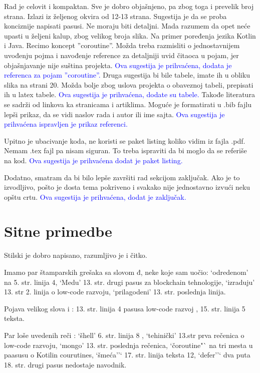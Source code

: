 \documentclass[a4paper]{report}
\newcommand{\odgovor}[1]{\textcolor{blue}{#1}}
\begin{document}
Rad je celovit i kompaktan. Sve je dobro objašnjeno, pa zbog toga i prevelik broj strana. Izlazi iz željenog okvira od 12-13 strana.
Sugestija je da se proba konciznije napisati pasusi. Ne moraju biti detaljni. Mada razumem da opet neće upasti u željeni kalup, zbog velikog broja slika. 
Na primer poređenja jezika Kotlin i Java. Recimo koncept ''coroutine''. Možda treba razmisliti o jednostavnijem uvođenju pojma i navođenje reference za detaljniji uvid čitaoca u pojam, jer objašnjavanje nije suština projekta.
\odgovor{Ova sugestija je prihvaćena, dodata je referenca za pojam ''coroutine''.}
Druga sugestija bi bile tabele, imate ih u obliku slika na strani 20. Možda bolje zbog uslova projekta o obaveznoj tabeli, prepisati ih u latex tabele.
\odgovor{Ova sugestija je prihvaćena, dodate su tabele.}
Takođe literatura se sadrži od linkova ka stranicama i artiklima. Moguće je formatirati u .bib fajlu lepši prikaz, da se vidi naslov rada i autor ili ime sajta.
\odgovor{Ova sugestija je prihvaćena ispravljen je prikaz referenci.}

Upitno je ubacivanje koda, ne koristi se paket listing koliko vidim iz fajla .pdf. Nemam .tex fajl pa nisam siguran. To treba ispraviti da bi moglo da se referiše na kod.
\odgovor{Ova sugestija je prihvaćena dodat je paket listing.}

Dodatno, smatram da bi bilo lepše završiti rad sekcijom zaključak. Ako je to izvodljivo, pošto je dosta tema pokriveno i svakako nije jednostavno izvući neku opštu crtu.
\odgovor{Ova sugestija je prihvaćena, dodat je zaključak.}

\section{Sitne primedbe}

Stilski je dobro napisano, razumljivo je i čitko.

Imamo par štamparskih grešaka sa slovom đ, neke koje sam uočio: `odredenom' na 5. str. linija 4, `Medu' 13. str. drugi pasus za blockchain tehnologije, `izraduju' 13. str 2. linija o low-code razvoju, `prilagodeni' 13. str. poslednja linija.

Pojava velikog slova i : 13. str. linija 4 pasusa low-code razvoj , 15. str. linija 5 teksta.

Par loše uvedenih reči : `šhell' 6. str. linija 8 , `tehinički' 13.str prva rečenica o low-code razvoju, `mongo' 13. str. poslednja rečenica, `čoroutine"` na tri mesta u paasusu o Kotilin courutines, `šmeća''` 17. str. linija teksta 12, `defer''` dva puta 18. str. drugi pasus nedostaje navodnik.
\end{document}
